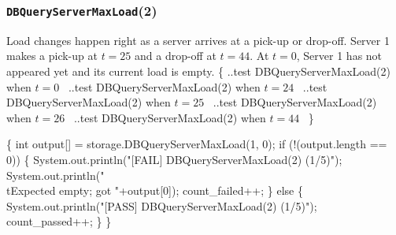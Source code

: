 \documentclass{article}
\def\nwendcode{\endtrivlist \endgroup}
\let\nwdocspar=\par
\begin{document}
\subsubsection{{\tt{}DBQueryServerMaxLoad}(2)}
Load changes happen right as a server arrives at a pick-up or drop-off.
Server 1 makes a pick-up at $t=25$ and a drop-off at $t=44$. At $t=0$, Server 1
has not appeared yet and its current load is empty.
\nwenddocs{}\endmoddef{}
\{
  \LA{}..test \code{}DBQueryServerMaxLoad\edoc{}(2) when $t=0$~{\nwtagstyle{}}\RA{}
  \LA{}..test \code{}DBQueryServerMaxLoad\edoc{}(2) when $t=24$~{\nwtagstyle{}}\RA{}
  \LA{}..test \code{}DBQueryServerMaxLoad\edoc{}(2) when $t=25$~{\nwtagstyle{}}\RA{}
  \LA{}..test \code{}DBQueryServerMaxLoad\edoc{}(2) when $t=26$~{\nwtagstyle{}}\RA{}
  \LA{}..test \code{}DBQueryServerMaxLoad\edoc{}(2) when $t=44$~{\nwtagstyle{}}\RA{}
\}
\nwendcode{}\nwdocspar
\nwenddocs{}\endmoddef{}
\{
  int output[] = storage.DBQueryServerMaxLoad(1, 0);
  if (!(output.length == 0)) \{
    System.out.println("[FAIL] DBQueryServerMaxLoad(2) (1/5)");
    System.out.println("\\tExpected empty; got "+output[0]);
    count_failed++;
  \} else \{
    System.out.println("[PASS] DBQueryServerMaxLoad(2) (1/5)");
    count_passed++;
  \}
\}
\nwendcode{}\nwdocspar
\nwenddocs{}\endmoddef{}
\end{document}

